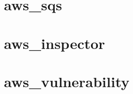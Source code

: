 \documentclass[twoside,12pt]{report}
\begin{document}
    
    
    
    
    
    
    
    \appendix
    \chapter{aws\_sqs}
    \label{app:sqs}
    
    
    \chapter{aws\_inspector}
    \label{app:inspector}
    

    \chapter{aws\_vulnerability}
    \label{app:aws_vulnerability}
    
    
    
    \beforebibliography
    
    
    
    \closingpage
    
    
\end{document}
